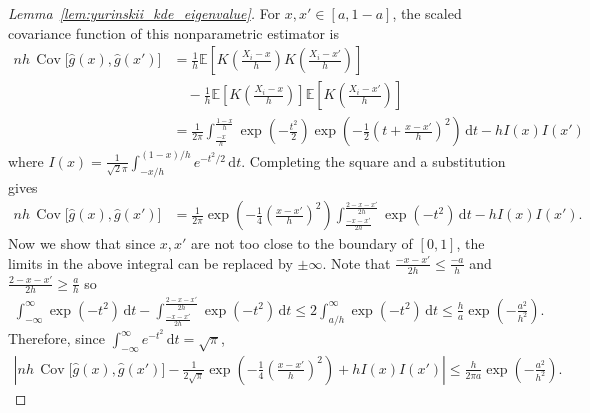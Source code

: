 \documentclass[11pt,lof]{puthesis}
\newcommand{\E}{\ensuremath{\mathbb{E}}}
\DeclareMathOperator{\Cov}{Cov}
\newcommand{\diff}[1]{\,\mathrm{d}#1}
\theoremstyle{break}
\theoremstyle{proof}
\newtheorem{proof}{Proof}
\begin{document}
\begin{proof}[Lemma~\ref{lem:yurinskii_kde_eigenvalue}]

  For $x, x' \in [a, 1-a]$, the scaled covariance function
  of this nonparametric estimator is
  \begin{align*}
    n h\, \Cov\big[\hat g(x), \hat g(x')\big]
    &=
    \frac{1}{h}
    \E \left[
      K \left( \frac{X_i - x}{h} \right)
      K \left( \frac{X_i - x'}{h} \right)
    \right] \\
    &\quad-
    \frac{1}{h}
    \E \left[
      K \left( \frac{X_i - x}{h} \right)
    \right]
    \E \left[
      K \left( \frac{X_i - x'}{h} \right)
    \right] \\
    &=
    \frac{1}{2 \pi}
    \int_{\frac{-x}{h}}^{\frac{1-x}{h}}
    \exp \left( - \frac{t^2}{2} \right)
    \exp \left( - \frac{1}{2} \left( t + \frac{x - x'}{h} \right)^2 \right)
    \diff t
    - h I(x) I(x')
  \end{align*}
  where
  $I(x) = \frac{1}{\sqrt 2 \pi} \int_{-x/h}^{(1-x)/h} e^{-t^2/2} \diff t$.
  Completing the square and a substitution gives
  \begin{align*}
    n h\, \Cov\big[\hat g(x), \hat g(x')\big]
    &=
    \frac{1}{2 \pi}
    \exp \left( - \frac{1}{4} \left( \frac{x-x'}{h} \right)^2 \right)
    \int_{\frac{-x-x'}{2h}}^{\frac{2-x-x'}{2h}}
    \exp \left(-t^2\right)
    \diff t
    - h I(x) I(x').
  \end{align*}
  Now we show that since $x, x'$ are not too close to the boundary
  of $[0,1]$,
  the limits in the above integral can be replaced by $\pm \infty$.
  Note that $\frac{-x-x'}{2h} \leq \frac{-a}{h}$
  and $\frac{2-x-x'}{2h} \geq \frac{a}{h}$ so
  \begin{align*}
    \int_{-\infty}^{\infty}
    \exp \left(-t^2\right)
    \diff t
    - \int_{\frac{-x-x'}{2h}}^{\frac{2-x-x'}{2h}}
    \exp \left(-t^2\right)
    \diff t
    \leq
    2 \int_{a/h}^\infty
    \exp \left(-t^2\right)
    \diff t
    \leq
    \frac{h}{a}
    \exp \left(- \frac{a^2}{h^2}\right).
  \end{align*}
  Therefore, since
  $\int_{-\infty}^{\infty} e^{-t^2} \diff t = \sqrt \pi$,
  \begin{align*}
    \left|
    n h\, \Cov\big[\hat g(x), \hat g(x')\big]
    - \frac{1}{2 \sqrt \pi}
    \exp \left( - \frac{1}{4} \left( \frac{x-x'}{h} \right)^2 \right)
    + h I(x) I(x')
    \right|
    \leq
    \frac{h}{2 \pi a}
    \exp \left(- \frac{a^2}{h^2}\right).
  \end{align*}

\end{proof}
\end{document}
